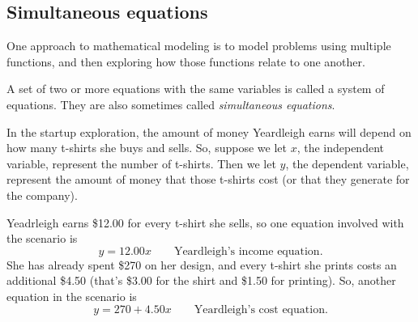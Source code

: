 
\subsection{Simultaneous equations}

One approach to mathematical modeling is to model problems using multiple functions, and then exploring how those functions relate to one another. 

\begin{boxdef}
A set of two or more equations with the same variables is called a \gls{system of equations}. They are also sometimes called \textit{simultaneous equations}.
\end{boxdef}



In the startup exploration, the amount of money Yeardleigh earns will depend on how many t-shirts she buys and sells. So, suppose we let $x$, the independent variable, represent the number of t-shirts. Then we let $y$, the dependent variable, represent the amount of money that those t-shirts cost (or that they generate for the company).

Yeadrleigh earns \$12.00 for every t-shirt she sells, so one equation involved with the scenario is \[y = 12.00x \qquad\text{Yeardleigh's income equation}.\] She has already spent \$270 on her design, and every t-shirt she prints costs an additional \$4.50 (that's \$3.00 for the shirt and \$1.50 for printing). So, another equation in the scenario is \[y = 270 + 4.50x\qquad\text{Yeardleigh's cost equation}.\]

